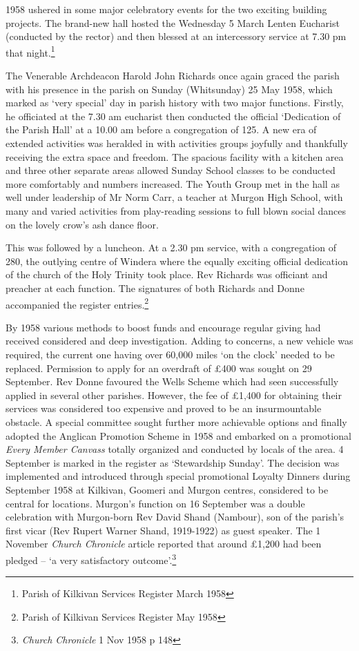 1958 ushered in some major celebratory events for the two exciting building projects. The brand-new hall hosted the Wednesday 5 March Lenten Eucharist (conducted by the rector) and then blessed at an intercessory service at 7.30 pm that night.\footnote{Parish of Kilkivan Services Register March 1958}

The Venerable Archdeacon Harold John Richards once again graced the parish with his presence in the parish on Sunday (Whitsunday) 25 May 1958, which marked as `very special' day in parish history with two major functions. Firstly, he officiated at the 7.30 am eucharist then conducted the official `Dedication of the Parish Hall' at a 10.00 am before a congregation of 125. A new era of extended activities was heralded in with activities groups joyfully and thankfully receiving the extra space and freedom. The spacious facility with a kitchen area and three other separate areas allowed Sunday School classes to be conducted more comfortably and numbers increased. The Youth Group met in the hall as well under leadership of Mr Norm Carr, a teacher at Murgon High School, with many and varied activities from play-reading sessions to full blown social dances on the lovely crow's ash dance floor.

This was followed by a luncheon. At a 2.30 pm service, with a congregation of 280, the outlying centre of Windera where the equally exciting official dedication of the church of the Holy Trinity took place. Rev Richards was officiant and preacher at each function. The signatures of both Richards and Donne accompanied the register entries.\footnote{Parish of Kilkivan Services Register May 1958}

By 1958 various methods to boost funds and encourage regular giving had received considered and deep investigation. Adding to concerns, a new vehicle was required, the current one having over 60,000 miles `on the clock' needed to be replaced. Permission to apply for an overdraft of £400 was sought on 29 September. Rev Donne favoured the Wells Scheme which had seen successfully applied in several other parishes. However, the fee of £1,400 for obtaining their services was considered too expensive and proved to be an insurmountable obstacle. A special committee sought further more achievable options and finally adopted the Anglican Promotion Scheme in 1958 and embarked on a promotional \emph{Every Member Canvass} totally organized and conducted by locals of the area. 4 September is marked in the register as `Stewardship Sunday'. The decision was implemented and introduced through special promotional Loyalty Dinners during September 1958 at Kilkivan, Goomeri and Murgon centres, considered to be central for locations. Murgon's function on 16 September was a double celebration with Murgon-born Rev David Shand (Nambour), son of the parish's first vicar (Rev Rupert Warner Shand, 1919-1922) as guest speaker. The 1 November \emph{Church Chronicle} article reported that around £1,200 had been pledged -- `a very satisfactory outcome'.\footnote{\emph{Church Chronicle} 1 Nov 1958 p 148}

